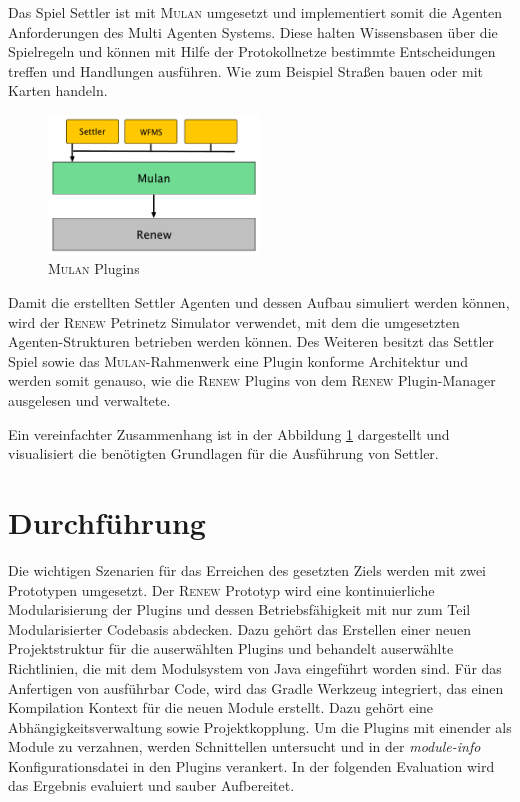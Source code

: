 		Das Spiel Settler ist mit \textsc{Mulan} umgesetzt und implementiert somit die Agenten Anforderungen des Multi Agenten Systems. Diese halten Wissensbasen über die Spielregeln und können mit Hilfe der Protokollnetze bestimmte Entscheidungen treffen und Handlungen ausführen. Wie zum Beispiel Straßen bauen oder mit Karten handeln.\bigbreak
		
		\begin{figure}[h!]
		  \centering
		  \includegraphics[width=0.5\textwidth]{material/images/settler-mulan-renew.pdf}
		  \caption{\textsc{Mulan} Plugins}
		  \label{fig:mulan_plugin}
		\end{figure}

		Damit die erstellten Settler Agenten und dessen Aufbau simuliert werden können, wird der \textsc{Renew} Petrinetz Simulator verwendet, mit dem die umgesetzten Agenten-Strukturen betrieben werden können.\newline
		Des Weiteren besitzt das Settler Spiel sowie das \textsc{Mulan}-Rahmenwerk eine Plugin konforme Architektur und werden somit genauso, wie die \textsc{Renew} Plugins von dem \textsc{Renew} Plugin-Manager ausgelesen und verwaltete.\bigbreak

		Ein vereinfachter Zusammenhang ist in der Abbildung \ref{fig:mulan_plugin} dargestellt und visualisiert die benötigten Grundlagen für die Ausführung von Settler.

\section{Durchführung} \label{sec:durchführung}
	Die wichtigen Szenarien für das Erreichen des gesetzten Ziels werden mit zwei Prototypen umgesetzt. Der \textsc{Renew} Prototyp wird eine kontinuierliche  Modularisierung der Plugins und dessen Betriebsfähigkeit mit nur zum Teil Modularisierter Codebasis abdecken. Dazu gehört das Erstellen einer neuen Projektstruktur für die auserwählten Plugins und behandelt auserwählte Richtlinien, die mit dem Modulsystem von Java eingeführt worden sind. Für das Anfertigen von ausführbar Code, wird das Gradle Werkzeug integriert, das einen Kompilation Kontext für die neuen Module erstellt. Dazu gehört eine Abhängigkeitsverwaltung sowie Projektkopplung. Um die Plugins mit einender als Module zu verzahnen, werden Schnittellen untersucht und in der \textit{module-info} Konfigurationsdatei in den Plugins verankert. In der folgenden Evaluation wird das Ergebnis evaluiert und sauber Aufbereitet.\bigbreak 

